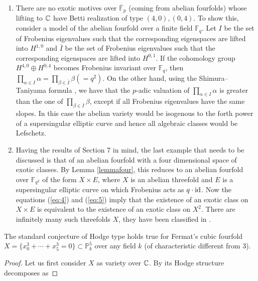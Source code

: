 \documentclass[11pt]{amsart}
\begin{document}
\begin{appendices}
\begin{remark}
\begin{enumerate}
As already pointed out, these examples are less interesting for the standard conjecture of Hodge type, see Remark \ref{boris}(\ref{duccio}).
\item\label{altreesotiche2} There are no exotic motives over $\overline{\mathbb{F}}_p$ (coming from abelian fourfolds) whose lifting  to $\mathbb{C}$ have Betti realization    of type $(4,0),(0,4)$. To show this, consider a model of the abelian fourfold over a finite field $\mathbb{F}_{q}$. Let $I$ be the set of Frobenius eigenvalues such that the corresponding eigenspaces are lifted into $H^{1,0}$ and $\bar{I}$ be the set of Frobenius eigenvalues such that the corresponding eigenspaces are lifted into $H^{0,1}$. If the cohomology group $H^{4,0}\oplus H^{0,4}$ becomes Frobenius invariant over $\mathbb{F}_q$, then $\prod_{\alpha\in I} \alpha = \prod_{\beta\in \bar{I}} \beta(=q^2).$ On the other hand, using the Shimura--Taniyama formula  \cite[Lemma 5]{TateBour}, we have that the $p$-adic valuation of  $\prod_{\alpha\in I} \alpha$ is greater than the one of $ \prod_{\beta\in \bar{I}} \beta$, except if all Frobenius eigenvalues have the same slopes. In this case the abelian variety would be isogenous to the forth power of a supersingular elliptic curve and hence all algebraic classes would be Lefschetz.
\item Having the results of Section 7 in mind, the last example  that needs to be discussed is that of an abelian fourfold with a four dimensional space of exotic classes. By Lemma \ref{lemmafour}, this reduces to an abelian fourfold over  $\mathbb{F}_{q^2}$  of the form $X\times E$, where $X$ is an abelian threefold and $E$ is a supersingular elliptic curve on which   Frobenius acts as $q \cdot \mathrm{id}$. Now the equations  (\ref{eq:4}) and  (\ref{eq:5}) imply that the existence of an exotic class on  $X\times E$ is equivalent to the existence of an exotic class on $X^2$. There are infinitely many such threefolds $X$, they have been classified in \cite{Zah}. 
\end{enumerate}
\end{remark}
\begin{proposition}\label{propfermat}
The standard conjecture of Hodge type holds true for Fermat's cubic fourfold
$X=\{x_0^3+\cdots +x_5^3=0\}\subset \mathbb{P}_k^5$ over any field $k$ (of characteristic different from $3$).
\end{proposition}
\begin{proof}
Let us first consider $X$ as variety over $\mathbb{C}$.  By \cite[Proposition 11]{Beauville} its Hodge structure decomposes as

\end{proof}
\end{appendices}
\end{document}
